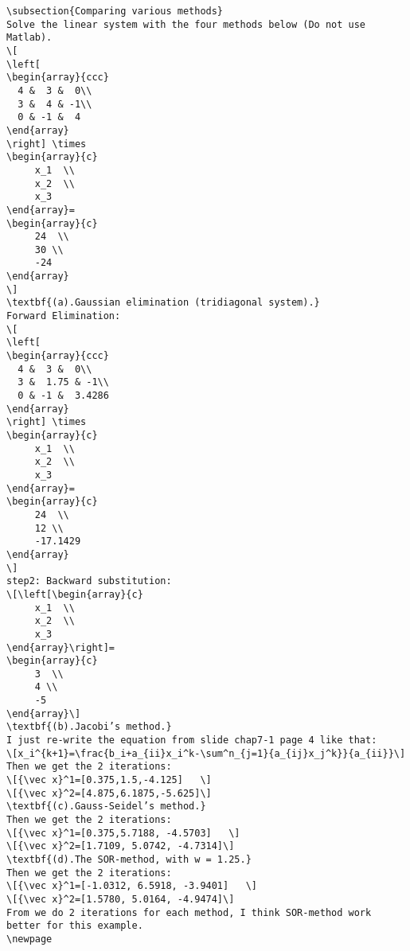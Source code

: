 \begin{verbatim}
\subsection{Comparing various methods}
Solve the linear system with the four methods below (Do not use Matlab).
\[
\left[ 
\begin{array}{ccc}
  4 &  3 &  0\\
  3 &  4 & -1\\
  0 & -1 &  4
\end{array}
\right] \times
\begin{array}{c}
     x_1  \\
     x_2  \\
     x_3
\end{array}=
\begin{array}{c}
     24  \\
     30 \\
     -24 
\end{array}
\]
\textbf{(a).Gaussian elimination (tridiagonal system).} 
Forward Elimination:
\[
\left[ 
\begin{array}{ccc}
  4 &  3 &  0\\
  3 &  1.75 & -1\\
  0 & -1 &  3.4286
\end{array}
\right] \times
\begin{array}{c}
     x_1  \\
     x_2  \\
     x_3
\end{array}=
\begin{array}{c}
     24  \\
     12 \\
     -17.1429 
\end{array}
\]
step2: Backward substitution:
\[\left[\begin{array}{c}
     x_1  \\
     x_2  \\
     x_3
\end{array}\right]=
\begin{array}{c}
     3  \\
     4 \\
     -5 
\end{array}\]
\textbf{(b).Jacobi’s method.}
I just re-write the equation from slide chap7-1 page 4 like that:
\[x_i^{k+1}=\frac{b_i+a_{ii}x_i^k-\sum^n_{j=1}{a_{ij}x_j^k}}{a_{ii}}\]
Then we get the 2 iterations:
\[{\vec x}^1=[0.375,1.5,-4.125]   \]
\[{\vec x}^2=[4.875,6.1875,-5.625]\]
\textbf{(c).Gauss-Seidel’s method.}
Then we get the 2 iterations:
\[{\vec x}^1=[0.375,5.7188, -4.5703]   \]
\[{\vec x}^2=[1.7109, 5.0742, -4.7314]\]
\textbf{(d).The SOR-method, with w = 1.25.}
Then we get the 2 iterations:
\[{\vec x}^1=[-1.0312, 6.5918, -3.9401]   \]
\[{\vec x}^2=[1.5780, 5.0164, -4.9474]\]
From we do 2 iterations for each method, I think SOR-method work better for this example.
\newpage

\end{verbatim}
